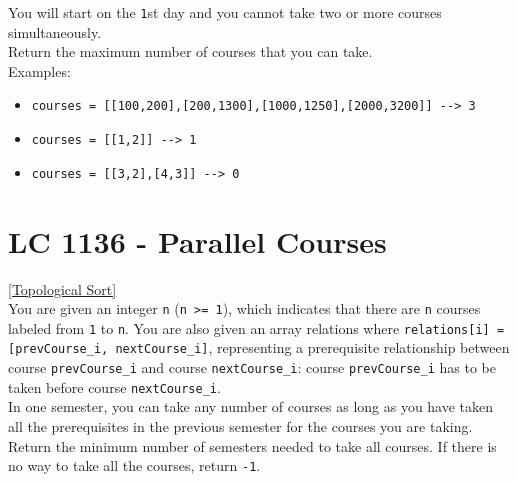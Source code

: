 You will start on the {\colorbox{CodeBackground}{\lstinline|1|}}st day and you cannot take two or more courses simultaneously.\\

Return the maximum number of courses that you can take.\\

Examples:
\begin{itemize}
\item {\colorbox{CodeBackground}{\lstinline|courses = [[100,200],[200,1300],[1000,1250],[2000,3200]] --> 3|}}
\item {\colorbox{CodeBackground}{\lstinline|courses = [[1,2]] --> 1|}}
\item {\colorbox{CodeBackground}{\lstinline|courses = [[3,2],[4,3]] --> 0|}}
\end{itemize}

\section{LC 1136 - Parallel Courses}\label{lc1136}
{\hyperref[sec:topological_sort]{[Topological Sort]}}\\

You are given an integer {\colorbox{CodeBackground}{\lstinline|n|}} ({\colorbox{CodeBackground}{\lstinline|n >= 1|}}), which indicates that there are {\colorbox{CodeBackground}{\lstinline|n|}} courses labeled from {\colorbox{CodeBackground}{\lstinline|1|}} to {\colorbox{CodeBackground}{\lstinline|n|}}. You are also given an array relations where {\colorbox{CodeBackground}{\lstinline|relations[i] = [prevCourse_i, nextCourse_i]|}}, representing a prerequisite relationship between course {\colorbox{CodeBackground}{\lstinline|prevCourse_i|}} and course {\colorbox{CodeBackground}{\lstinline|nextCourse_i|}}: course {\colorbox{CodeBackground}{\lstinline|prevCourse_i|}} has to be taken before course {\colorbox{CodeBackground}{\lstinline|nextCourse_i|}}.\\

In one semester, you can take any number of courses as long as you have taken all the prerequisites in the previous semester for the courses you are taking.\\

Return the minimum number of semesters needed to take all courses. If there is no way to take all the courses, return {\colorbox{CodeBackground}{\lstinline|-1|}}.

